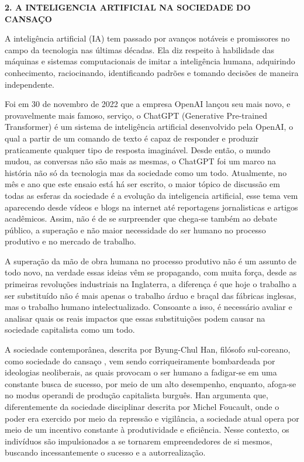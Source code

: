 \begin{titulo}
    \raggedright\raggedright\textbf{2. A INTELIGENCIA ARTIFICIAL NA SOCIEDADE DO CANSAÇO}
\end{titulo}
\par
A inteligência artificial (IA) tem passado por avanços notáveis e promissores no campo da tecnologia nas últimas décadas. Ela diz respeito à habilidade das máquinas e sistemas computacionais de imitar a inteligência humana, adquirindo conhecimento, raciocinando, identificando padrões e tomando decisões de maneira independente.
\par
Foi em 30 de novembro de 2022 que a empresa OpenAI lançou seu mais novo, e provavelmente  mais famoso, serviço, o ChatGPT  (Generative Pre-trained Transformer) é um sistema de inteligência artificial desenvolvido pela OpenAI, o qual a partir de um comando de texto é capaz de responder e produzir praticamente qualquer tipo de resposta imaginável. Desde então, o mundo mudou, as conversas não são mais as mesmas, o ChatGPT foi um marco na história não só da tecnologia mas da sociedade como um todo. Atualmente, no mês e ano que este ensaio está há ser escrito, o maior tópico de discussão em todas as esferas da sociedade é a evolução da inteligencia artificial, esse tema vem aparecendo desde vídeos e blogs na internet até reportagens jornalisticas e artigos acadêmicos. Assim, não é de se surpreender que chega-se também ao debate público, a superação e não maior necessidade do ser humano no processo produtivo e no mercado de trabalho.
\par
A superação da mão de obra humana no processo produtivo não é um assunto de todo novo, na verdade essas ideias vêm se propagando, com muita força, desde as primeiras revoluções industriais na Inglaterra, a diferença é que hoje o trabalho a ser substituído não é mais apenas o trabalho árduo e braçal das fábricas inglesas, mas o trabalho humano intelectualizado. Consoante a isso, é necessário avaliar e analisar quais os reais impactos que essas substituições podem causar na sociedade capitalista como um todo.
\par
A sociedade contemporânea, descrita por Byung-Chul Han, filósofo sul-coreano, como sociedade do cansaço \cite{han2015sociedade}, vem sendo corriqueiramente bombardeada por ideologias neoliberais, as quais provocam o ser humano a fadigar-se em uma constante busca de sucesso, por meio de um alto desempenho, enquanto, afoga-se no modus operandi de produção capitalista burguês. Han argumenta que, diferentemente da sociedade disciplinar descrita por Michel Foucault, onde o poder era exercido por meio da repressão e vigilância, a sociedade atual opera por meio de um incentivo constante à produtividade e eficiência. Nesse contexto, os indivíduos são impulsionados a se tornarem empreendedores de si mesmos, buscando incessantemente o sucesso e a autorrealização.
